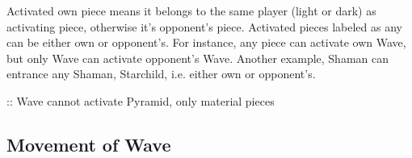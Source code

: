 
Activated own piece means it belongs to the same player (light or dark) as activating
piece, otherwise it's opponent's piece. Activated pieces labeled as any can be either
own or opponent's.\newline
\indent
For instance, any piece can activate own Wave, but only Wave can activate opponent's
Wave. Another example, Shaman can entrance any Shaman, Starchild, i.e. either own
or opponent's.

\TODO :: Wave cannot activate Pyramid, only material pieces

\clearpage %

\subsection*{Movement of Wave}
\label{sec:Appendix/Movement of Wave}

